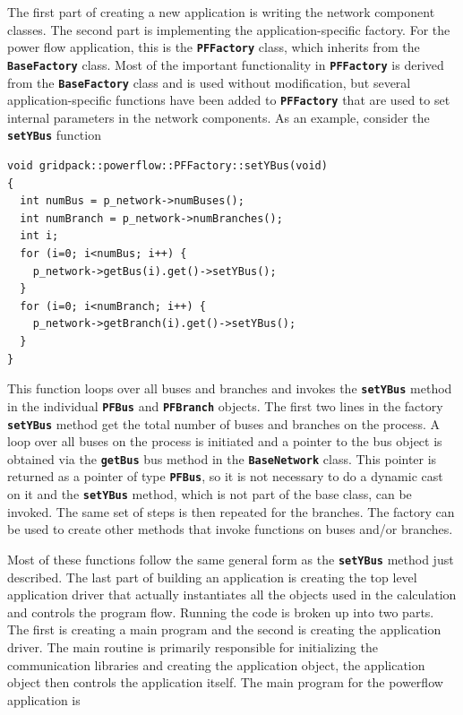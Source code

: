 The first part of creating a new application is writing the network component classes. The second part is implementing the application-specific factory. For the power flow application, this is the \texttt{\textbf{PFFactory}} class, which inherits from the \texttt{\textbf{BaseFactory}} class. Most of the important functionality in \texttt{\textbf{PFFactory}} is derived from the \texttt{\textbf{BaseFactory}} class and is used without modification, but several application-specific functions have been added to \texttt{\textbf{PFFactory}} that are used to set internal parameters in the network components. As an example, consider the \texttt{\textbf{setYBus}} function

{
\color{red}
\begin{Verbatim}[fontseries=b]
void gridpack::powerflow::PFFactory::setYBus(void)
{
  int numBus = p_network->numBuses();
  int numBranch = p_network->numBranches();
  int i;
  for (i=0; i<numBus; i++) {
    p_network->getBus(i).get()->setYBus();
  }
  for (i=0; i<numBranch; i++) {
    p_network->getBranch(i).get()->setYBus();
  }
}
\end{Verbatim}
}

This function loops over all buses and branches and invokes the \texttt{\textbf{setYBus}} method in the individual \texttt{\textbf{PFBus}} and \texttt{\textbf{PFBranch}} objects. The first two lines in the factory \texttt{\textbf{setYBus}} method get the total number of buses and branches on the process. A loop over all buses on the process is initiated and a pointer to the bus object is obtained via the \texttt{\textbf{getBus}} bus method in the \texttt{\textbf{BaseNetwork}} class. This pointer is returned as a pointer of type \texttt{\textbf{PFBus}}, so it is not necessary to do a dynamic cast on it and the \texttt{\textbf{setYBus}} method, which is not part of the base class, can be invoked. The same set of steps is then repeated for the branches. The factory can be used to create other methods that invoke functions on buses and/or branches. 

Most of these functions follow the same general form as the \texttt{\textbf{setYBus}} method just described.
The last part of building an application is creating the top level application driver that actually instantiates all the objects used in the calculation and controls the program flow. Running the code is broken up into two parts. The first is creating a main program and the second is creating the application driver. The main routine is primarily responsible for initializing the communication libraries and creating the application object, the application object then controls the application itself. The main program for the powerflow application is

